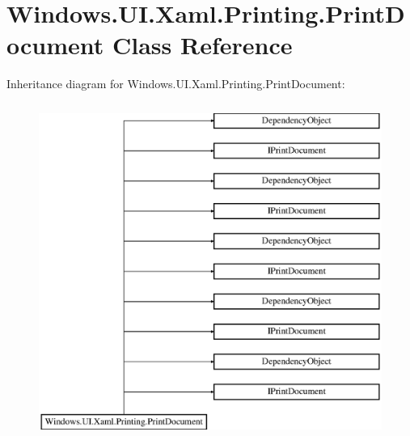 \hypertarget{class_windows_1_1_u_i_1_1_xaml_1_1_printing_1_1_print_document}{}\section{Windows.\+U\+I.\+Xaml.\+Printing.\+Print\+Document Class Reference}
\label{class_windows_1_1_u_i_1_1_xaml_1_1_printing_1_1_print_document}
Inheritance diagram for Windows.\+U\+I.\+Xaml.\+Printing.\+Print\+Document\+:\begin{figure}[H]
\begin{center}
\leavevmode
\includegraphics[height=11.000000cm]{class_windows_1_1_u_i_1_1_xaml_1_1_printing_1_1_print_document}
\end{center}
\end{figure}
